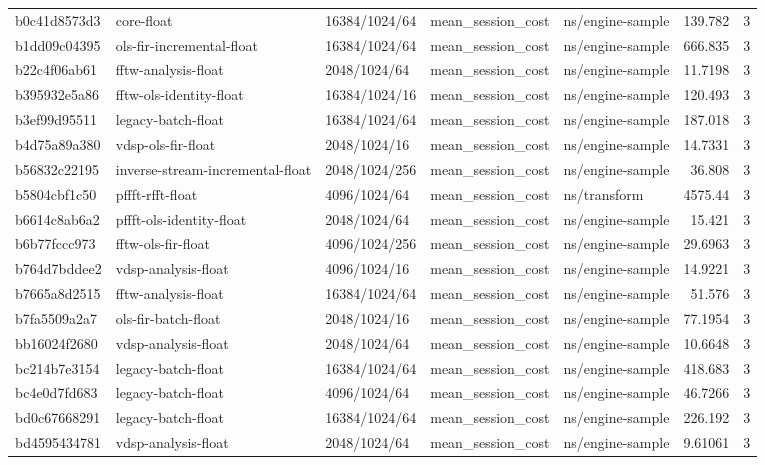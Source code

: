 \begin{longtable}{lllllrr}
b0c41d8573d3 & core-float & 16384/1024/64 & mean\_session\_cost & ns/engine-sample & 139.782 & 3 \\
b1dd09c04395 & ols-fir-incremental-float & 16384/1024/64 & mean\_session\_cost & ns/engine-sample & 666.835 & 3 \\
b22c4f06ab61 & fftw-analysis-float & 2048/1024/64 & mean\_session\_cost & ns/engine-sample & 11.7198 & 3 \\
b395932e5a86 & fftw-ols-identity-float & 16384/1024/16 & mean\_session\_cost & ns/engine-sample & 120.493 & 3 \\
b3ef99d95511 & legacy-batch-float & 16384/1024/64 & mean\_session\_cost & ns/engine-sample & 187.018 & 3 \\
b4d75a89a380 & vdsp-ols-fir-float & 2048/1024/16 & mean\_session\_cost & ns/engine-sample & 14.7331 & 3 \\
b56832c22195 & inverse-stream-incremental-float & 2048/1024/256 & mean\_session\_cost & ns/engine-sample & 36.808 & 3 \\
b5804cbf1c50 & pffft-rfft-float & 4096/1024/64 & mean\_session\_cost & ns/transform & 4575.44 & 3 \\
b6614c8ab6a2 & pffft-ols-identity-float & 2048/1024/64 & mean\_session\_cost & ns/engine-sample & 15.421 & 3 \\
b6b77fccc973 & fftw-ols-fir-float & 4096/1024/256 & mean\_session\_cost & ns/engine-sample & 29.6963 & 3 \\
b764d7bddee2 & vdsp-analysis-float & 4096/1024/16 & mean\_session\_cost & ns/engine-sample & 14.9221 & 3 \\
b7665a8d2515 & fftw-analysis-float & 16384/1024/64 & mean\_session\_cost & ns/engine-sample & 51.576 & 3 \\
b7fa5509a2a7 & ols-fir-batch-float & 2048/1024/16 & mean\_session\_cost & ns/engine-sample & 77.1954 & 3 \\
bb16024f2680 & vdsp-analysis-float & 2048/1024/64 & mean\_session\_cost & ns/engine-sample & 10.6648 & 3 \\
bc214b7e3154 & legacy-batch-float & 16384/1024/64 & mean\_session\_cost & ns/engine-sample & 418.683 & 3 \\
bc4e0d7fd683 & legacy-batch-float & 4096/1024/64 & mean\_session\_cost & ns/engine-sample & 46.7266 & 3 \\
bd0c67668291 & legacy-batch-float & 16384/1024/64 & mean\_session\_cost & ns/engine-sample & 226.192 & 3 \\
bd4595434781 & vdsp-analysis-float & 2048/1024/64 & mean\_session\_cost & ns/engine-sample & 9.61061 & 3 \\

\end{longtable}
